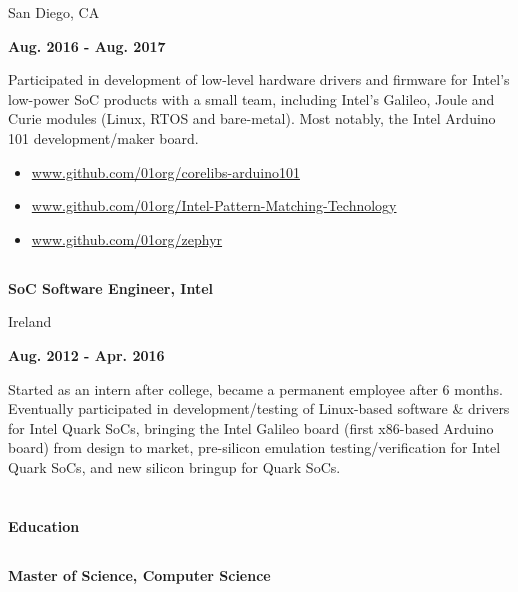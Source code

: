 \documentclass[6pt]{article}
\begin{document}
\begin{minipage}{38em}
\begin{minipage}{20em}
{San Diego, CA}
\end{minipage}
\hfill
\begin{minipage}{12em}
{\bfseries Aug. 2016 - Aug. 2017}
\end{minipage}
\begin{flushleft}
Participated in development of low-level hardware drivers and firmware for Intel's low-power
SoC products with a small team, including Intel's Galileo, Joule and Curie modules (Linux,
RTOS and bare-metal). Most notably, the Intel Arduino 101 development/maker board.
\begin{itemize}
    \setlength\itemsep{0em}
    \item \url{www.github.com/01org/corelibs-arduino101}
    \item \url{www.github.com/01org/Intel-Pattern-Matching-Technology}
    \item \url{www.github.com/01org/zephyr}
\end{itemize}
\end{flushleft}
\dotfill
%
%
\subsection*{}
\begin{minipage}{20em}
{\bfseries SoC Software Engineer, Intel

Ireland}

\end{minipage}
\hfill
\begin{minipage}{12em}
{\bfseries \hfill Aug. 2012 - Apr. 2016}
\end{minipage}
\begin{flushleft}
Started as an intern after college, became a permanent employee after 6 months. Eventually
participated in development/testing of Linux-based software \& drivers for Intel Quark SoCs,
bringing the Intel Galileo board (first x86-based Arduino board) from design to market,
pre-silicon emulation testing/verification for Intel Quark SoCs, and new silicon bringup for Quark SoCs.
\end{flushleft}

\section*{}
{\Large \bfseries Education}

\dotfill
\subsection*{}
\begin{flushleft}
{\bfseries Master of Science, Computer Science}


\end{flushleft}
\end{minipage}
\end{document}

